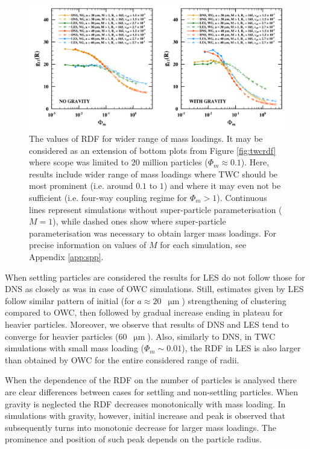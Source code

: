 \documentclass{pracamgren}
\begin{document}
\begin{figure}[h]
\centering
\includegraphics[width=13.5cm]{figures/2-09_twcrdfext.pdf}
\caption{
The values of RDF for wider range of mass loadings.
It may be considered as an extension of bottom plots from Figure \ref{fig:twcrdf} where scope was limited to $20$ million particles (${\Phi_m \approx 0.1}$).
Here, results include wider range of mass loadings where TWC should be most prominent (i.e. around $0.1$ to $1$) and where it may even not be sufficient (i.e. four-way coupling regime for $\Phi_m > 1$).
Continuous lines represent simulations without super-particle parameterisation ($M=1$), while dashed ones show where super-particle parameterisation was necessary to obtain larger mass loadings.
For precise information on values of $M$ for each simulation, see Appendix \ref{app:spp}. 
}
\label{fig:twcrdfext}
\end{figure}


When settling particles are considered the results for LES do not follow those for DNS as closely as was in case of OWC simulations.
Still, estimates given by LES follow similar pattern of initial (for $a \approx 20$~$\upmu\text{m}$) strengthening of clustering compared to OWC, then followed by gradual increase ending in plateau for heavier particles.
Moreover, we observe that results of DNS and LES tend to converge for heavier particles ($60$~$\upmu\text{m}$).
Also, similarly to DNS, in TWC simulations with small mass loading ($\Phi_m \sim 0.01$), the RDF in LES is also larger than obtained by OWC for the entire considered range of radii.

When the dependence of the RDF on the number of particles is analysed there are clear differences between cases for settling and non-settling particles.
When gravity is neglected the RDF decreases monotonically with mass loading.
In simulations with gravity, however, initial increase and peak is observed that subsequently turns into monotonic decrease for larger mass loadings.
The prominence and position of such peak depends on the particle radius.
\end{document}
